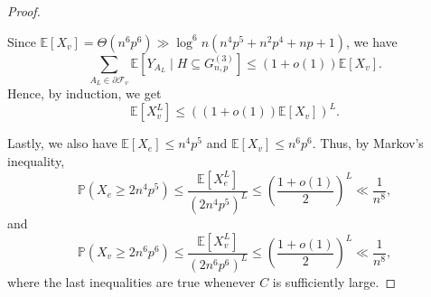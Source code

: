 \documentclass[11pt,a4paper,oneside,reqno]{amsart}
\newcommand{\Gnp}{G_{n, p}^{(3)}}
\newcommand{\cF}{\mathcal{F}}
\newcommand{\cT}{\mathcal{T}}
\renewcommand{\Pr}{\mathbb{P}}
\newcommand{\1}{\mathbbm{1}} %
\renewcommand{\le}{\leqslant}
\renewcommand{\ge}{\geqslant}
\newcommand{\ext}{\mathrm{ext}}
\renewcommand{\int}{\mathrm{int}}
\begin{document}
\begin{proof}
\begin{itemize}
    \end{itemize}

    Since $\mathbb{E}\left[X_v\right] = \Theta(n^6 p^6) \gg \log^6 n (n^4 p^5 + n^2p^4 + n p + 1)$, we have
    \[
        \sum_{A_L \in \partial \cF_v} \mathbb{E}\left[Y_{A_L} \mid H \subseteq \Gnp\right] \le (1 + o(1)) \mathbb{E}\left[X_v\right].
    \]
    Hence, by induction, we get
    \[
        \mathbb{E}\left[X_v^L\right] \le \left((1+o(1)) \mathbb{E}\left[X_v\right]\right)^L.
    \]

    Lastly, we also have $\mathbb{E}\left[X_e\right] \le n^4 p^5$ and $\mathbb{E}\left[X_v\right] \le n^6 p^6$. Thus, by Markov's inequality,
    \[
        \Pr\left(X_e \ge 2 n^4 p^5\right) \le \frac{\mathbb{E}\left[X^L_e\right]}{\left(2 n^4 p^5\right)^L} \le \left(\frac{1+o(1)}{2}\right)^L \ll \frac{1}{n^8},
    \]
    and
    \[
        \Pr\left(X_v \ge 2 n^6 p^6\right) \le \frac{\mathbb{E}\left[X^L_v\right]}{\left(2 n^6 p^6\right)^L} \le \left(\frac{1+o(1)}{2}\right)^L \ll \frac{1}{n^8},
    \]
    where the last inequalities are true whenever $C$ is sufficiently large.
\end{proof}

\end{document}
